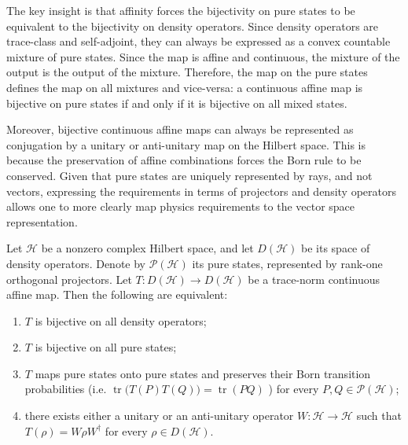 \documentclass[entropy,article,submit,moreauthors]{Definitions/mdpi}
\DeclareMathOperator{\tr}{tr}
\begin{document}
The key insight is that affinity forces the bijectivity on pure states to be equivalent to the bijectivity on density operators. Since density operators are trace-class and self-adjoint, they can always be expressed as a convex countable mixture of pure states. Since the map is affine and continuous, the mixture of the output is the output of the mixture. Therefore, the map on the pure states defines the map on all mixtures and vice-versa: a continuous affine map is bijective on pure states if and only if it is bijective on all mixed states.

Moreover, bijective continuous affine maps can always be represented as conjugation by a unitary or anti-unitary map on the Hilbert space. This is because the preservation of affine combinations forces the Born rule to be conserved. Given that pure states are uniquely represented by rays, and not vectors, expressing the requirements in terms of projectors and density operators allows one to more clearly map physics requirements to the vector space representation.

\begin{Proposition}\label{AFF-PURE}
	Let $\mathcal{H}$ be a nonzero complex Hilbert space, and let
	$D(\mathcal{H})$ be its space of density operators. Denote by
	$\mathcal{P}(\mathcal{H})$ its pure states, represented by rank-one
	orthogonal projectors. Let
	$T:D(\mathcal{H})\to D(\mathcal{H})$
	be a trace-norm continuous affine map. Then the following are equivalent:
	\begin{enumerate}
		\item $T$ is bijective on all density operators;
		\item $T$ is bijective on all pure states;
		\item $T$ maps pure states onto pure states and preserves their
		Born transition probabilities (i.e. $	\tr\bigl(T(P)T(Q)\bigr)=\tr(PQ)$ ) for every $P,Q\in\mathcal{P}(\mathcal{H})$;
		\item there exists either a unitary or an anti-unitary operator $W:\mathcal{H}\to\mathcal{H}$ such that $T(\rho)=W\rho W^\dagger$ for every $\rho\in D(\mathcal{H})$.
	\end{enumerate}
\end{Proposition}
\end{document}
